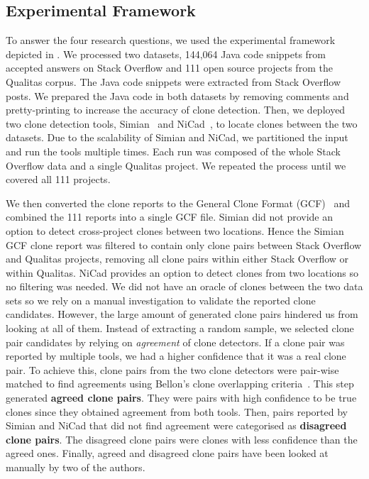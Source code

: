\documentclass[sigconf,review, anonymous]{acmart}
\begin{document}
\subsection{Experimental Framework}

To answer the four research questions, we used the experimental
framework depicted in . We processed two
datasets, 144,064 Java code snippets from accepted answers on Stack
Overflow and 111 open source projects from the Qualitas corpus. The
Java code snippets were extracted from Stack Overflow posts. We
prepared the Java code in both datasets by removing comments and
pretty-printing to increase the accuracy of clone detection. Then, we
deployed two clone detection tools, Simian~\cite{simian} and
NiCad~\cite{Roy2008,Cordy}, to locate clones between the two datasets.
Due to the scalability of Simian and NiCad, we partitioned the input
and run the tools multiple times. Each run was composed of the whole
Stack Overflow data and a single Qualitas project. We repeated the
process until we covered all 111 projects.

We then converted the clone reports to the General Clone Format
(GCF)~\cite{Wang2013} and combined the 111 reports into a single GCF
file.
Simian did not provide an option to detect cross-project clones
between two locations. Hence the Simian GCF clone report was filtered
to contain only clone pairs between Stack Overflow and Qualitas
projects, removing all clone pairs within either Stack Overflow or
within Qualitas. NiCad provides an option to detect clones from two
locations so no filtering was needed. We did not have an oracle of clones
between the two data sets so we rely on a manual investigation to
validate the reported clone candidates. However, the large amount of
generated clone pairs hindered us from looking at all of them.
Instead of extracting a random sample, we selected clone pair
candidates by relying on \emph{agreement} of clone detectors. If a
clone pair was reported by multiple tools, we had a higher
confidence that it was a real clone pair. To achieve this, clone pairs
from the two clone detectors were pair-wise matched to find agreements
using Bellon's clone overlapping criteria~\cite{Bellon2007}. This step
generated \textbf{agreed clone
  pairs}. They were pairs with high confidence to be true clones since
they obtained agreement from both tools. Then, pairs reported by
Simian and NiCad that did not find agreement were categorised as
\textbf{disagreed clone pairs}. The disagreed clone pairs were clones
with less confidence than the agreed ones. Finally, agreed and
disagreed clone pairs have been looked at manually by two of the
authors.
\end{document}

